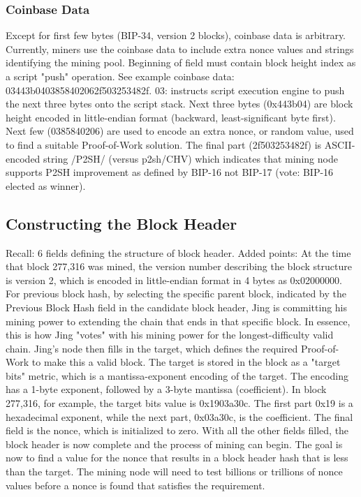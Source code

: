 \documentclass[english, 11pt]{article}
\begin{document}
\subsubsection{Coinbase Data}
\noindent Except for first few bytes (BIP-34, version 2 blocks), coinbase data is arbitrary. Currently, miners use the coinbase data to include extra nonce values and strings identifying the mining pool. Beginning of field must contain block height index as a script "push" operation. See example coinbase data: 03443b0403858402062f503253482f. 03: instructs script execution engine to push the next three bytes onto the script stack. Next three bytes (0x443b04) are block height encoded in little-endian format (backward, least-significant byte first). Next few (0385840206) are used to encode an extra nonce, or random value, used to find a suitable Proof-of-Work solution. The final part (2f503253482f) is ASCII-encoded string /P2SH/ (versus p2sh/CHV) which indicates that mining node supports P2SH improvement as defined by BIP-16 not BIP-17 (vote: BIP-16 elected as winner). 

\subsection{Constructing the Block Header}

\noindent Recall: 6 fields defining the structure of block header. Added points: At the time that block 277,316 was mined, the version number describing the block structure is version 2, which is encoded in little-endian format in 4 bytes as 0x02000000. For previous block hash, by selecting the specific parent block, indicated by the Previous Block Hash field in the candidate block header, Jing is committing his mining power to extending the chain that ends in that specific block. In essence, this is how Jing "votes" with his mining power for the longest-difficulty valid chain. Jing’s node then fills in the target, which defines the required Proof-of-Work to make this a valid block. The target is stored in the block as a "target bits" metric, which is a mantissa-exponent encoding of the target. The encoding has a 1-byte exponent, followed by a 3-byte mantissa (coefficient). In block 277,316, for example, the target bits value is 0x1903a30c. The first part 0x19 is a hexadecimal exponent, while the next part, 0x03a30c, is the coefficient. The final field is the nonce, which is initialized to zero. With all the other fields filled, the block header is now complete and the process of mining can begin. The goal is now to find a value for the nonce that results in a block header hash that is less than the target. The mining node will need to test billions or trillions of nonce values before a nonce is found that satisfies the requirement.
\end{document}
